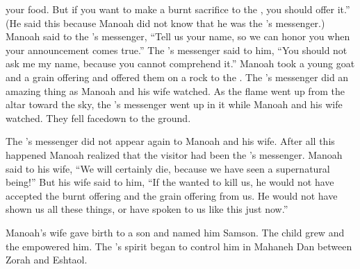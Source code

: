 {your food.
But if
you want to make
a burnt sacrifice
to the
{}, you should offer
it.” (He said this because
Manoah
did not
know
that
he was the
{}’s
messenger.)
Manoah
said
to
the
{}’s
messenger,
“Tell us your name,
so we can honor
you when your announcement
comes true.”
The
{}’s
messenger
said
to him, “You should
not ask
me my name,
because you cannot comprehend it.”
Manoah
took
a young
goat
and a grain offering
and offered
them on
a rock
to the
{}. The
{}’s messenger did
an amazing
thing as Manoah
and his wife
watched.
As the flame
went up
from the altar
toward the sky,
the
{}’s
messenger
went up
in it
while Manoah
and his wife
watched.
They fell
facedown to the ground.
\par }{\PP {}The
{}’s
messenger
did not
appear
again
to
Manoah
and his
wife.
After all this happened Manoah
realized
that
the visitor had been the
{}’s
messenger.
Manoah
said
to
his wife,
“We
will certainly die,
because
we have seen
a supernatural being!”
But his wife
said
to him, “If
the {}
wanted
to kill
us,
he would
not
have accepted
the burnt offering
and the grain offering
from us. He would
not
have shown
us
all
these
things,
or
have
spoken
to us like
this just now.”
\par }{\PP {}Manoah’s
wife
gave birth to a son
and named
him Samson.
The child
grew
and the
{}
empowered him.
The
{}’s
spirit
began
to control him in Mahaneh
Dan
between
Zorah
and Eshtaol.

}
